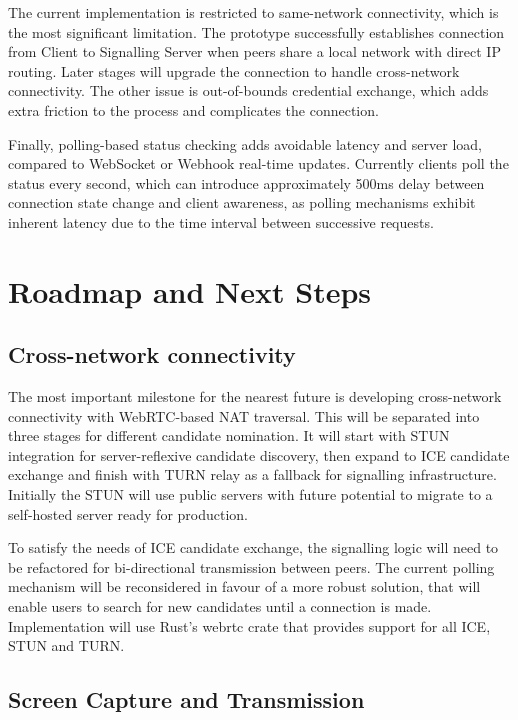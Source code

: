 \documentclass[12pt,a4paper]{article}
\begin{document}
The current implementation is restricted to same-network connectivity, which is the most significant limitation. The prototype successfully establishes connection from Client to Signalling Server when peers share a local network with direct IP routing. Later stages will upgrade the connection to handle cross-network connectivity. The other issue is out-of-bounds credential exchange, which adds extra friction to the process and complicates the connection.

Finally, polling-based status checking adds avoidable latency and server load, compared to WebSocket or Webhook real-time updates. Currently clients poll the status every second, which can introduce approximately 500ms delay between connection state change and client awareness, as polling mechanisms exhibit inherent latency due to the time interval between successive requests.

\section{Roadmap and Next Steps}

\subsection{Cross-network connectivity}

The most important milestone for the nearest future is developing cross-network connectivity with WebRTC-based NAT traversal. This will be separated into three stages for different candidate nomination. It will start with STUN integration for server-reflexive candidate discovery, then expand to ICE candidate exchange and finish with TURN relay as a fallback for signalling infrastructure. Initially the STUN will use public servers with future potential to migrate to a self-hosted server ready for production.

To satisfy the needs of ICE candidate exchange, the signalling logic will need to be refactored for bi-directional transmission between peers. The current polling mechanism will be reconsidered in favour of a more robust solution, that will enable users to search for new candidates until a connection is made. Implementation will use Rust's webrtc crate that provides support for all ICE, STUN and TURN.

\subsection{Screen Capture and Transmission}
\end{document}

